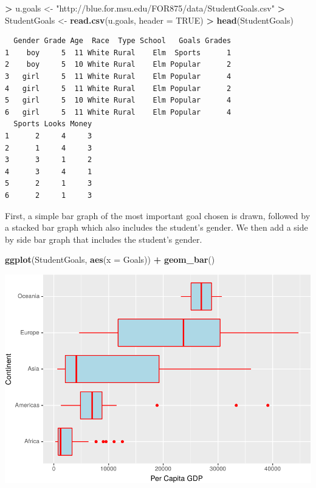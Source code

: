 \documentclass[]{krantz}
\makeatletter
\newenvironment{Shaded}{\begin{snugshade}}{\end{snugshade}}
\newcommand{\DataTypeTok}[1]{\textcolor[rgb]{0.27,0.27,0.27}{#1}}
\newcommand{\KeywordTok}[1]{\textcolor[rgb]{0.27,0.27,0.27}{\textbf{#1}}}
\newcommand{\NormalTok}[1]{#1}
\newcommand{\OperatorTok}[1]{\textcolor[rgb]{0.43,0.43,0.43}{\textbf{#1}}}
\newcommand{\OtherTok}[1]{\textcolor[rgb]{0.37,0.37,0.37}{#1}}
\newcommand{\StringTok}[1]{\textcolor[rgb]{0.5,0.5,0.5}{#1}}
\newenvironment{kframe}{%
\medskip{}
\setlength{\fboxsep}{.8em}
 \def\at@end@of@kframe{}%
 \ifinner\ifhmode%
  \def\at@end@of@kframe{\end{minipage}}%
  \begin{minipage}{\columnwidth}%
 \fi\fi%
 \def\FrameCommand##1{\hskip\@totalleftmargin \hskip-\fboxsep
 \colorbox{shadecolor}{##1}\hskip-\fboxsep
     \hskip-\linewidth \hskip-\@totalleftmargin \hskip\columnwidth}%
 \MakeFramed {\advance\hsize-\width
   \@totalleftmargin\z@ \linewidth\hsize
   \@setminipage}}%
 {\par\unskip\endMakeFramed%
 \at@end@of@kframe}
\renewenvironment{Shaded}{\begin{kframe}}{\end{kframe}}
\makeatother
\begin{document}
\begin{Shaded}
\begin{Highlighting}[]
\OperatorTok{>}\StringTok{ }\NormalTok{u.goals <-}\StringTok{ "http://blue.for.msu.edu/FOR875/data/StudentGoals.csv"}
\OperatorTok{>}\StringTok{ }\NormalTok{StudentGoals <-}\StringTok{ }\KeywordTok{read.csv}\NormalTok{(u.goals, }\DataTypeTok{header =} \OtherTok{TRUE}\NormalTok{)}
\OperatorTok{>}\StringTok{ }\KeywordTok{head}\NormalTok{(StudentGoals)}
\end{Highlighting}
\end{Shaded}

\begin{verbatim}
  Gender Grade Age  Race  Type School   Goals Grades
1    boy     5  11 White Rural    Elm  Sports      1
2    boy     5  10 White Rural    Elm Popular      2
3   girl     5  11 White Rural    Elm Popular      4
4   girl     5  11 White Rural    Elm Popular      2
5   girl     5  10 White Rural    Elm Popular      4
6   girl     5  11 White Rural    Elm Popular      4
  Sports Looks Money
1      2     4     3
2      1     4     3
3      3     1     2
4      3     4     1
5      2     1     3
6      2     1     3
\end{verbatim}

First, a simple bar graph of the most important goal chosen is drawn, followed by a stacked bar graph which also includes the student's gender. We then add a side by side bar graph that includes the student's gender.

\begin{Shaded}
\begin{Highlighting}[]
\KeywordTok{ggplot}\NormalTok{(StudentGoals, }\KeywordTok{aes}\NormalTok{(}\DataTypeTok{x =}\NormalTok{ Goals)) }\OperatorTok{+}\StringTok{ }\KeywordTok{geom_bar}\NormalTok{()}
\end{Highlighting}
\end{Shaded}

\includegraphics{bookdown_files/figure-latex/unnamed-chunk-78-1.pdf}
\end{document}
